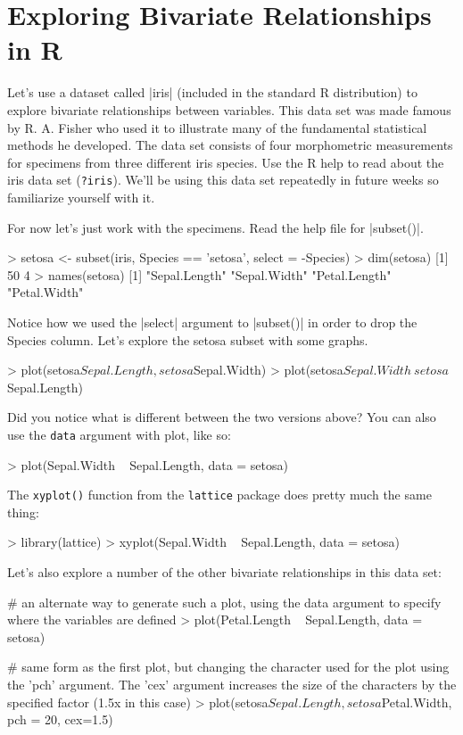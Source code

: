 \section{Exploring Bivariate Relationships in R}


Let's use a dataset called |iris| (included in the standard R distribution) to explore bivariate relationships between variables. This data set was made famous by R. A. Fisher who used it to illustrate many of the fundamental statistical methods he developed. The data set consists of four morphometric measurements for specimens from three different iris species. Use the R help to read about the iris data set (\lstinline!?iris!). We'll be using this data set repeatedly in future weeks so familiarize yourself with it.
%

For now let's just work with the  specimens. Read the help file for |subset()|.
\begin{R}
> setosa <- subset(iris, Species == 'setosa', select = -Species)
> dim(setosa)
[1] 50  4
> names(setosa)
[1] "Sepal.Length" "Sepal.Width"  "Petal.Length" "Petal.Width"
\end{R}
Notice how we used the |select| argument to |subset()| in order to drop the Species column. Let's explore the setosa subset with some graphs.
%
\begin{R}
> plot(setosa$Sepal.Length, setosa$Sepal.Width)
> plot(setosa$Sepal.Width ~ setosa$Sepal.Length)
\end{R}
Did you notice what is different between the two versions above? You can
also use the \lstinline!data! argument with plot, like so:
\begin{R}
> plot(Sepal.Width ~ Sepal.Length, data = setosa)
\end{R}
The \lstinline!xyplot()! function from the \lstinline!lattice! package
does pretty much the same thing:
%
\begin{R}
> library(lattice)
> xyplot(Sepal.Width ~ Sepal.Length, data = setosa)
\end{R}

Let's also explore a number of the other bivariate relationships in this data set:
%
\begin{R}
# an alternate way to generate such a plot, using the data argument to specify where the variables are defined
> plot(Petal.Length ~ Sepal.Length, data = setosa)

# same form as the first plot, but changing the character used for the plot using the 'pch' argument. The 'cex' argument increases the size of the characters by the specified factor (1.5x in this case)
> plot(setosa$Sepal.Length, setosa$Petal.Width, pch = 20, cex=1.5)
\end{R}

